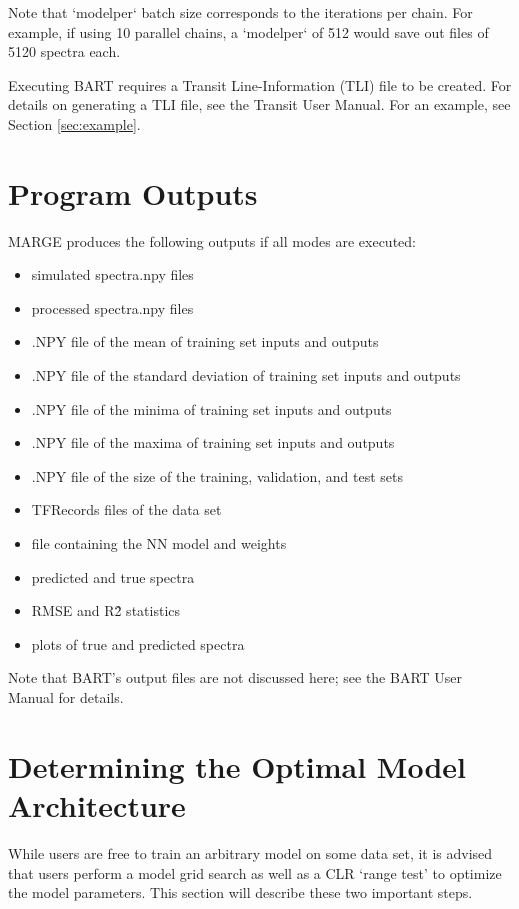 \documentclass[letterpaper, 12pt]{article}
\begin{document}
\noindent Note that `modelper` batch size corresponds to the iterations per 
chain.  For example, if using 10 parallel chains, a `modelper` of 512 would 
save out files of 5120 spectra each.

\noindent  Executing BART requires a Transit Line-Information (TLI) file to 
be created.  For details on generating a TLI file, see the Transit User Manual.
For an example, see Section \ref{sec:example}.



\section{Program Outputs}
\label{sec:outputs}

MARGE produces the following outputs if all modes are executed:

\begin{itemize}
\item simulated spectra.npy files
\item processed spectra.npy files
\item .NPY file of the mean of training set inputs and outputs
\item .NPY file of the standard deviation of training set inputs and outputs
\item .NPY file of the minima of training set inputs and outputs
\item .NPY file of the maxima of training set inputs and outputs
\item .NPY file of the size of the training, validation, and test sets
\item TFRecords files of the data set
\item file containing the NN model and weights
\item predicted and true spectra
\item RMSE and R\^2 statistics
\item plots of true and predicted spectra
\end{itemize}

\noindent Note that BART's output files are not discussed here; see the BART 
User Manual for details.

\section{Determining the Optimal Model Architecture}
\label{sec:optarch}
While users are free to train an arbitrary model on some data set, it is 
advised that users perform a model grid search as well as a CLR `range test' 
to optimize the model parameters.  This section will describe these two 
important steps.
\end{document}
